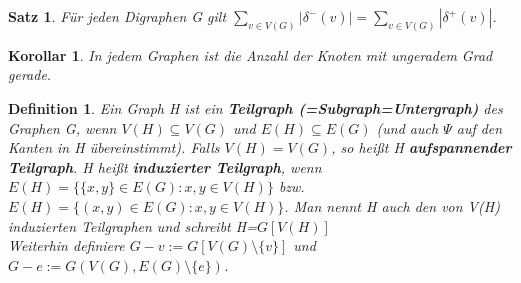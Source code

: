 \documentclass[12pt,a4paper]{article}
\theoremstyle{plain}
\newtheorem{Satz}[Theorem]{Satz}
\newtheorem{Korollar}[Theorem]{Korollar}
\newtheorem{Definition}[Theorem]{Definition}
\newcommand{\herv}[1]{{\emph{\textbf{#1}}}}
\numberwithin{equation}{section}
\begin{document}
\begin{Satz}
Für jeden Digraphen G gilt $\sum_{v\in V(G)}{|\delta^-(v)|}=\sum_{v\in V(G)}{|\delta^+(v)|}$.
\end{Satz}
\begin{Korollar}
In jedem Graphen ist die Anzahl der Knoten mit ungeradem Grad gerade.
\end{Korollar}
\begin{Definition}
Ein Graph H ist ein \herv{Teilgraph (=Subgraph=Untergraph)} des Graphen G, wenn $V(H)\subseteq V(G)$ und $E(H)\subseteq E(G)$ (und auch $\Psi$ auf den Kanten in H übereinstimmt). Falls $V(H)=V(G)$, so heißt H \herv{aufspannender Teilgraph}. H heißt \herv{induzierter Teilgraph}, wenn $E(H)=\{\{x,y\}\in E(G):x,y\in V(H)\}$ bzw. $E(H)=\{(x,y)\in E(G):x,y\in V(H)\}$. Man nennt H auch den von V(H) induzierten Teilgraphen und schreibt H=$G\left[V(H)\right]$\\
Weiterhin definiere $G-v := G\left[V(G)\setminus \{v\}\right]$ und $G-e:= G(V(G),E(G)\setminus \{e\})$.
\end{Definition}
\end{document}
